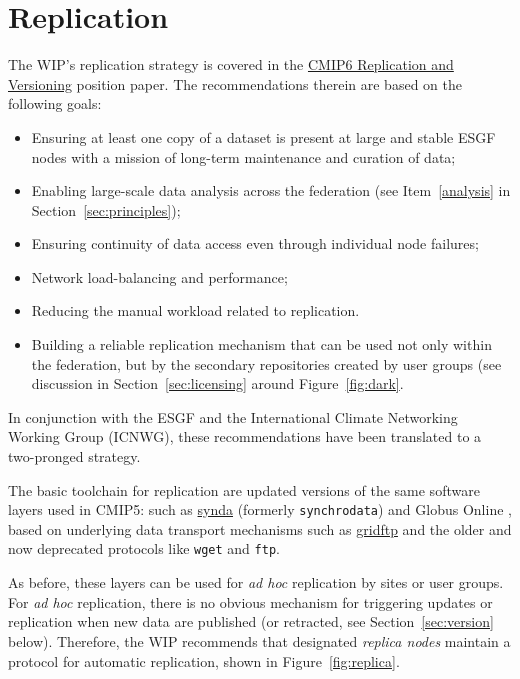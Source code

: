 \documentclass[gmd,manuscript]{copernicus}
\newcommand{\pipref}[1] {\citep{ref:#1}}
\newcommand{\figref}[1] {\mbox{Figure   \ref{fig:#1}}}
\newcommand{\secref}[1] {\mbox{Section  \ref{sec:#1}}}
\begin{document}
\section{Replication}
\label{sec:replica}

The WIP's replication strategy is covered in the
\href{https://goo.gl/jqWjQ5}{CMIP6 Replication and Versioning}
position paper. The recommendations therein are based on the following
goals:

\begin{itemize}
\item Ensuring at least one copy of a dataset is present at large and
  stable ESGF nodes with a mission of long-term maintenance and
  curation of data;
\item Enabling large-scale data analysis across the federation (see
  Item~\ref{analysis} in \secref{principles});
\item Ensuring continuity of data access even through individual node
  failures;
\item Network load-balancing and performance;
\item Reducing the manual workload related to replication.
\item Building a reliable replication mechanism that can be used not
  only within the federation, but by the secondary repositories
  created by user groups (see discussion in \secref{licensing} around
  \figref{dark}.
\end{itemize}

In conjunction with the ESGF and the International Climate Networking
Working Group (ICNWG), these recommendations have been translated to a
two-pronged strategy.

The basic toolchain for replication are updated versions of the same
software layers used in CMIP5: such as
\href{https://github.com/Prodiguer/synda}{synda} (formerly
\texttt{synchrodata}) and Globus Online \pipref{allenetal2012}, based
on underlying data transport mechanisms such as
\href{https://goo.gl/Z8xcfE}{gridftp} and the older and now deprecated
protocols like \texttt{wget} and \texttt{ftp}.

As before, these layers can be used for \emph{ad hoc} replication by
sites or user groups. For \emph{ad hoc} replication, there is no
obvious mechanism for triggering updates or replication when new data
are published (or retracted, see \secref{version} below). Therefore,
the WIP recommends that designated \emph{replica nodes} maintain a
protocol for automatic replication, shown in \figref{replica}.
\end{document}
